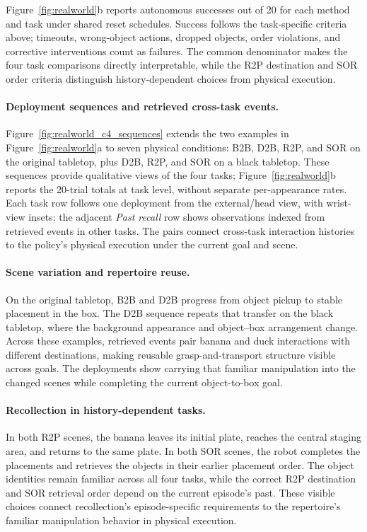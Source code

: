 Figure~\ref{fig:realworld}b reports autonomous successes out of 20 for each method and task under shared reset schedules.
Success follows the task-specific criteria above; timeouts, wrong-object actions, dropped objects, order violations, and corrective interventions count as failures.
The common denominator makes the four task comparisons directly interpretable, while the R2P destination and SOR order criteria distinguish history-dependent choices from physical execution.

\paragraph{Deployment sequences and retrieved cross-task events.}
Figure~\ref{fig:realworld_c4_sequences} extends the two examples in Figure~\ref{fig:realworld}a to seven physical conditions: B2B, D2B, R2P, and SOR on the original tabletop, plus D2B, R2P, and SOR on a black tabletop.
These sequences provide qualitative views of the four tasks; Figure~\ref{fig:realworld}b reports the 20-trial totals at task level, without separate per-appearance rates.
Each task row follows one deployment from the external/head view, with wrist-view insets; the adjacent \emph{Past recall} row shows observations indexed from retrieved events in other tasks.
The pairs connect cross-task interaction histories to the policy's physical execution under the current goal and scene.


\paragraph{Scene variation and repertoire reuse.}
On the original tabletop, B2B and D2B progress from object pickup to stable placement in the box.
The D2B sequence repeats that transfer on the black tabletop, where the background appearance and object--box arrangement change.
Across these examples, retrieved events pair banana and duck interactions with different destinations, making reusable grasp-and-transport structure visible across goals.
The deployments show \method{} carrying that familiar manipulation into the changed scenes while completing the current object-to-box goal.

\paragraph{Recollection in history-dependent tasks.}
In both R2P scenes, the banana leaves its initial plate, reaches the central staging area, and returns to the same plate.
In both SOR scenes, the robot completes the placements and retrieves the objects in their earlier placement order.
The object identities remain familiar across all four tasks, while the correct R2P destination and SOR retrieval order depend on the current episode's past.
These visible choices connect recollection's episode-specific requirements to the repertoire's familiar manipulation behavior in physical execution.

